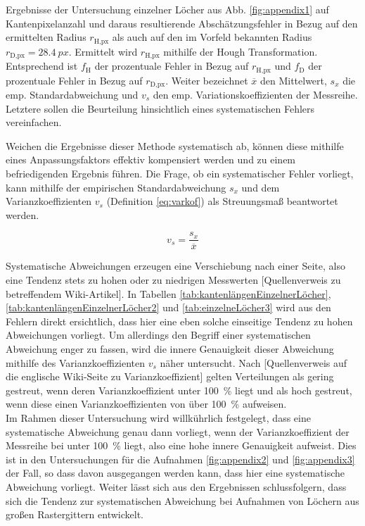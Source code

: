 \documentclass[accentcolor=tud1c, 11pt, toc=bib, toc=listof, captions=abovetable, parskip=half]{tudreport}
\begin{document}
\begin{table}[h!]
	\caption{Ergebnisse der Untersuchung einzelner Löcher aus Abb. \ref{fig:appendix1} auf Kantenpixelanzahl und daraus resultierende  Abschätzungsfehler in Bezug auf den ermittelten Radius $r_{\text{H,px}}$ als auch auf den im Vorfeld bekannten Radius $r_{\text{D,px}} = \SI{28.4}{px}$. Ermittelt wird $r_{\text{H,px}}$ mithilfe der Hough Transformation. Entsprechend ist $f_{\text{H}}$ der prozentuale Fehler in Bezug auf $r_{\text{H,px}}$ und $f_{\text{D}}$ der prozentuale Fehler in Bezug auf $r_{\text{D,px}}$. Weiter bezeichnet $\overline{x}$ den Mittelwert, $s_x$ die emp. Standardabweichung und $v_s$ den emp. Variationskoeffizienten der Messreihe. Letztere sollen die Beurteilung hinsichtlich eines systematischen Fehlers vereinfachen.}
	\centering
	
	\label{tab:kantenlängenEinzelnerLöcher}
\end{table}

Weichen die Ergebnisse dieser Methode systematisch ab, können diese mithilfe eines Anpassungsfaktors effektiv kompensiert werden und zu einem befriedigenden Ergebnis führen. Die Frage, ob ein systematischer Fehler vorliegt, kann mithilfe der empirischen Standardabweichung $s_x$ und dem Varianzkoeffizienten $v_s$ (Definition \ref{eq:varkof}) als Streuungsmaß beantwortet werden. 

\begin{equation}
v_s = \frac{s_x}{\overline{x}}
\label{eq:varkof}
\end{equation}

Systematische Abweichungen erzeugen eine Verschiebung nach einer Seite, also eine Tendenz stets zu hohen oder zu niedrigen Messwerten [Quellenverweis zu betreffendem Wiki-Artikel]. In Tabellen \ref{tab:kantenlängenEinzelnerLöcher}, \ref{tab:kantenlängenEinzelnerLöcher2} und \ref{tab:einzelneLöcher3} wird aus den Fehlern direkt ersichtlich, dass hier eine eben solche einseitige Tendenz zu hohen Abweichungen vorliegt. Um allerdings den Begriff einer systematischen Abweichung enger zu fassen, wird die innere Genauigkeit dieser Abweichung mithilfe des Varianzkoeffizienten $v_s$ näher untersucht. Nach [Quellenverweis auf die englische Wiki-Seite zu Varianzkoeffizient] gelten Verteilungen als gering gestreut, wenn deren Varianzkoeffizient unter \SI{100}{\percent} liegt und als hoch gestreut, wenn diese einen Varianzkoeffizienten von über \SI{100}{\percent} aufweisen.\\
Im Rahmen dieser Untersuchung wird willkührlich festgelegt, dass eine systematische Abweichung genau dann vorliegt, wenn der Varianzkoeffizient der Messreihe bei unter \SI{100}{\percent} liegt, also eine hohe innere Genauigkeit aufweist. Dies ist in den Untersuchungen für die Aufnahmen \ref{fig:appendix2} und \ref{fig:appendix3} der Fall, so dass davon ausgegangen werden kann, dass hier eine systematische Abweichung vorliegt. Weiter lässt sich aus den Ergebnissen schlussfolgern, dass sich die Tendenz zur systematischen Abweichung bei Aufnahmen von Löchern aus großen Rastergittern entwickelt.
\end{document}
